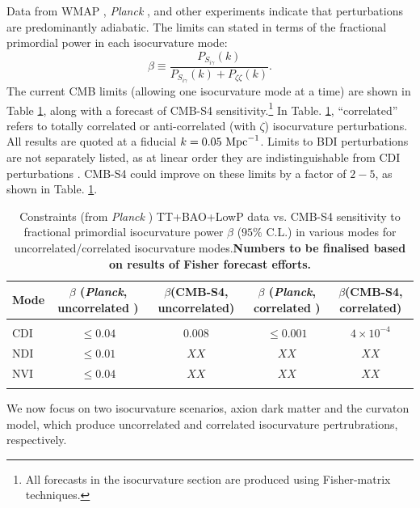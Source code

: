 Data from WMAP \cite{dunkley09}, \textit{Planck} \cite{Ade:2015lrj}, and other experiments \cite{Enqvist:2000hp,MacTavish:2005yk} indicate that perturbations are predominantly adiabatic. The limits can stated in terms of the fractional primordial power in each isocurvature mode:\begin{equation}
\beta\equiv \frac{P_{S_{i\gamma}}(k)}{P_{S_{i\gamma}}(k)+P_{\zeta\zeta}(k)}.
\end{equation}
The current CMB limits (allowing one isocurvature mode at a time) are shown in Table \ref{table:fisher_model_independent}, along with a forecast of CMB-S4 sensitivity.\footnote{All forecasts in the isocurvature section are produced using Fisher-matrix techniques.} In Table. \ref{table:fisher_model_independent}, ``correlated'' refers to totally correlated or anti-correlated (with $\zeta$) isocurvature perturbations. All results are quoted at a fiducial $k=0.05~{\rm Mpc}^{-1}$. Limits to BDI perturbations are not separately listed, as at linear order they are indistinguishable from CDI perturbations \cite{Gordon:2002gv,Lewis:2002nc,Lewis:2007kz,Gordon:2009wx}. CMB-S4 could improve on these limits by a factor of $2-5$, as shown in Table. \ref{table:fisher_model_independent}.

\begin{table}
\begin{center}
\begin{tabular}
{lcccc}\hline \hline {\rm Mode} &  $ \beta $ (\emph{Planck}, uncorrelated )&$ \beta$(CMB-S4, uncorrelated)&  $ \beta $ (\emph{Planck}, correlated )&$ \beta$(CMB-S4, correlated)\\ 
\hline \\
CDI & $\leq 0.04$&$0.008$&$\leq0.001$&$4\times 10^{-4}$\\
NDI &  $\leq 0.01$ &$XX$&$XX$&$XX$\\
NVI &  $\leq 0.04$&$XX$&$XX$&$XX$\\
\\ \hline \hline 
\end{tabular}
\caption{Constraints (from \emph{Planck} \cite{Ade:2015lrj}) TT+BAO+LowP data vs. CMB-S4 sensitivity to fractional primordial isocurvature power $\beta$ ($95\%$ C.L.) in various modes for uncorrelated/correlated isocurvature modes.\textbf{Numbers to be finalised based on results of Fisher forecast efforts.}
\label{table:fisher_model_independent}}
\end{center}
\end{table} 

We now focus on two isocurvature scenarios, axion dark matter and the curvaton model, which produce uncorrelated and correlated isocurvature pertrubrations, respectively.


